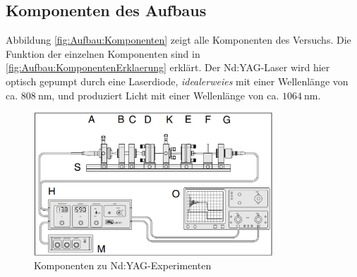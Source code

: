 \documentclass[../main.tex]{subfiles}
\begin{document}
    \subsection{Komponenten des Aufbaus}
        Abbildung \ref{fig:Aufbau:Komponenten} zeigt alle Komponenten des Versuchs. Die Funktion der einzelnen Komponenten sind in \ref{fig:Aufbau:KomponentenErklaerung} erklärt. Der Nd:YAG-Laser wird hier optisch gepumpt durch eine Laserdiode, \textit{idealerweies} mit einer Wellenlänge von ca. $\SI{808}{\nano\metre}$, und produziert Licht mit einer Wellenlänge von ca. $\SI{1064}{\nano\metre}$.
        \begin{figure}[H]
            \centering
            \includegraphics[width=0.8\textwidth]{Bilddateien/Versuchsaufbau/Komponenten.jpg}
            \caption{Komponenten zu Nd:YAG-Experimenten}
            \label{fig:Aubau:Komponenten}
        \end{figure}
\end{document}
